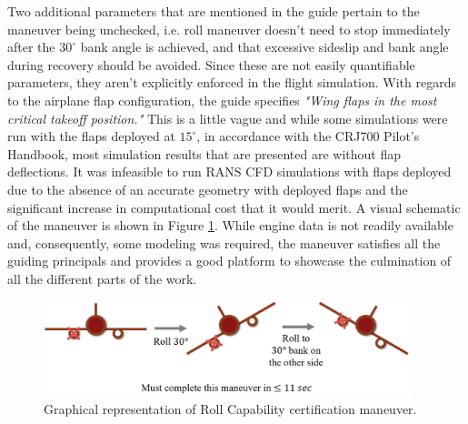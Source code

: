 Two additional parameters that are mentioned in the guide pertain to the maneuver being unchecked, i.e. roll maneuver doesn't need to stop immediately after the $30 ^\circ$ bank angle is achieved, and that excessive sideslip and bank angle during recovery should be avoided.
Since these are not easily quantifiable parameters, they aren't explicitly enforced in the flight simulation.
With regards to the airplane flap configuration, the guide specifies \textit{"Wing flaps in the most critical takeoff position."}
This is a little vague and while some simulations were run with the flaps deployed at $15^\circ$, in accordance with the CRJ700 Pilot's Handbook, most simulation results that are presented are without flap deflections. 
It was infeasible to run RANS CFD simulations with flaps deployed due to the absence of an accurate geometry with deployed flaps and the significant increase in computational cost that it would merit.  
A visual schematic of the maneuver is shown in Figure \ref{fig:roll_maneuver}.
While engine data is not readily available and, consequently, some modeling was required, the maneuver satisfies all the guiding principals and provides a good platform to showcase the culmination of all the different parts of the work.

\begin{figure}
    \center
    \includegraphics[width=0.95\textwidth]{suthesis/images/roll_maneuver.png}
    \caption{Graphical representation of Roll Capability certification maneuver. \label{fig:roll_maneuver}}
\end{figure}